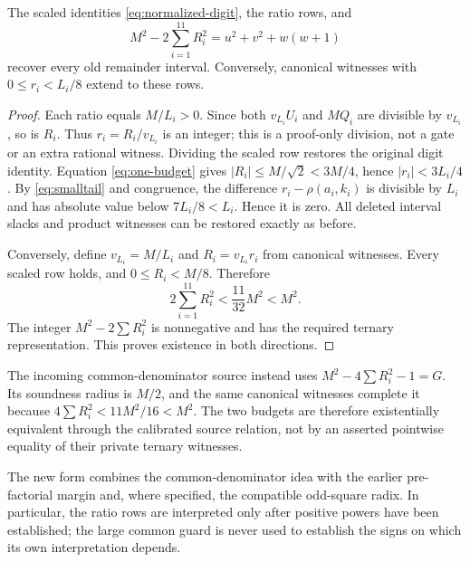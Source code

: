 \begin{lemma}\label{lem:normalized}
The scaled identities \eqref{eq:normalized-digit}, the ratio rows, and
\begin{equation}\label{eq:one-budget}
 M^2-2\sum_{i=1}^{11}R_i^2=u^2+v^2+w(w+1)
\end{equation}
recover every old remainder interval. Conversely, canonical witnesses with
$0\le r_i<L_i/8$ extend to these rows.
\end{lemma}
\begin{proof}
Each ratio equals $M/L_i>0$. Since both $v_{L_i}U_i$ and $MQ_i$ are
divisible by $v_{L_i}$, so is $R_i$. Thus
$r_i=R_i/v_{L_i}$ is an integer; this is a proof-only division, not a gate
or an extra rational witness. Dividing the scaled row restores the original
digit identity. Equation \eqref{eq:one-budget} gives $|R_i|\le M/\sqrt2<3M/4$, hence
$|r_i|<3L_i/4$. By \eqref{eq:smalltail} and congruence, the difference
$r_i-\rho(a_i,k_i)$ is divisible by $L_i$ and has absolute value below
$7L_i/8<L_i$. Hence it is zero. All deleted interval slacks and product
witnesses can be restored exactly as before.

Conversely, define $v_{L_i}=M/L_i$ and $R_i=v_{L_i}r_i$ from canonical
witnesses. Every scaled row holds, and $0\le R_i<M/8$. Therefore
\[
 2\sum_{i=1}^{11}R_i^2<\frac{11}{32}M^2<M^2.
\]
The integer $M^2-2\sum R_i^2$ is nonnegative and has the required
ternary representation. This proves existence in both directions.
\end{proof}
The incoming common-denominator source instead uses
$M^2-4\sum R_i^2-1=G$. Its soundness radius is $M/2$, and the same
canonical witnesses complete it because $4\sum R_i^2<11M^2/16<M^2$.
The two budgets are therefore existentially equivalent through the calibrated
source relation, not by an asserted pointwise equality of their private
ternary witnesses.

The new form combines the common-denominator idea with the earlier pre-factorial
margin and, where specified, the compatible odd-square radix. In
particular, the ratio rows are interpreted only after positive powers have
been established; the large common guard is never used to establish the
signs on which its own interpretation depends.

